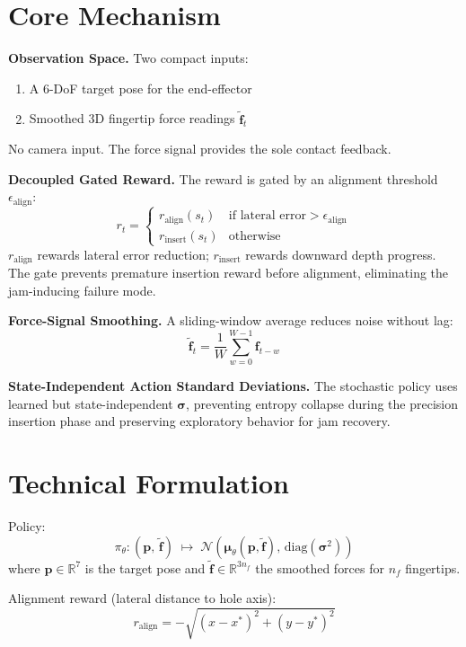 \documentclass[10pt,twocolumn]{article}
\begin{document}
\section{Core Mechanism}

\textbf{Observation Space.} Two compact inputs:
\begin{enumerate}[itemsep=2pt,parsep=0pt]
  \item A 6-DoF target pose for the end-effector
  \item Smoothed 3D fingertip force readings $\tilde{\mathbf{f}}_t$
\end{enumerate}
No camera input. The force signal provides the sole contact feedback.

\textbf{Decoupled Gated Reward.} The reward is gated by an alignment
threshold $\epsilon_{\mathrm{align}}$:
\[
r_t = \begin{cases}
r_{\mathrm{align}}(s_t) & \text{if lateral error} > \epsilon_{\mathrm{align}} \\
r_{\mathrm{insert}}(s_t) & \text{otherwise}
\end{cases}
\]
$r_{\mathrm{align}}$ rewards lateral error reduction; $r_{\mathrm{insert}}$
rewards downward depth progress. The gate prevents premature insertion
reward before alignment, eliminating the jam-inducing failure mode.

\textbf{Force-Signal Smoothing.} A sliding-window average reduces noise
without lag:
\[
\tilde{\mathbf{f}}_t = \frac{1}{W}\sum_{w=0}^{W-1}\mathbf{f}_{t-w}
\]

\textbf{State-Independent Action Standard Deviations.} The stochastic
policy uses learned but state-independent $\boldsymbol{\sigma}$, preventing
entropy collapse during the precision insertion phase and preserving
exploratory behavior for jam recovery.

\section{Technical Formulation}

Policy:
\[
\pi_\theta:
(\mathbf{p},\,\tilde{\mathbf{f}})\;\mapsto\;
\mathcal{N}\!\left(\boldsymbol{\mu}_\theta(\mathbf{p},\tilde{\mathbf{f}}),\,
\mathrm{diag}(\boldsymbol{\sigma}^2)\right)
\]
where $\mathbf{p}\in\mathbb{R}^7$ is the target pose and
$\tilde{\mathbf{f}}\in\mathbb{R}^{3n_f}$ the smoothed forces for $n_f$
fingertips.

Alignment reward (lateral distance to hole axis):
\[
r_{\mathrm{align}} = -\!\sqrt{(x-x^*)^2 + (y-y^*)^2}
\]
\end{document}
